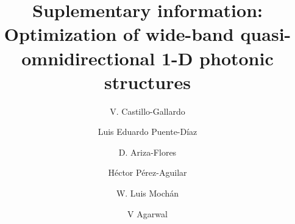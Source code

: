 \documentclass[a4paper,fleqn]{cas-sc}
\begin{document}
	\let\WriteBookmarks\relax
	\def\floatpagepagefraction{1}
	\def\textpagefraction{.001}
	
	\title [mode = title]{Suplementary information: Optimization of wide-band quasi-omnidirectional 1-D photonic structures}                      	
	\author[1,2,3]{V. Castillo-Gallardo}
	\cormark[1]
	\address[1]{Centro de Investigaci\'{o}n en Ingenier\'{i}a y
		Ciencias Aplicadas, Universidad del Estado de Morelos, Av.
		Universidad 1001, Col. Chamilpa, Cuernavaca, Morelos 62209,
		M\'{e}xico.}
	
	\author[1,2,3]{Luis Eduardo Puente-D\'{i}az}
	\address[2]{Instituto de Ciencias F\'{i}sicas, Universidad
		Nacional Aut\'{o}noma de M\'{e}xico, Av. Universidad S/N,
		Col. Chamilpa, 62210 Cuernavaca, Morelos, M\'{e}xico.}
	\address[3]{Facultad de Ciencias F\'{i}sico Matem\'{a}ticas,
		Universidad Michoacana de San Nicol\'{a}s de Hidalgo, Av.
		Francisco J. Múgica S/N 58030, Morelia, Mich., M\'{e}xico.}
	
	\author[4]{D. Ariza-Flores}
	\address[4]{CONACyT-Universidad Aut\'{o}noma de San Luis
		Potos\'{i}, Karakorum 1470, Lomas 4ta Secc, San Luis Potos\'{i},
		S.L.P., 78210, M\'{e}xico.}
	
	\author[3]{H\'{e}ctor P\'{e}rez-Aguilar}
	
	\author[2]{W. Luis Moch\'{a}n}
	\cormark[2]
	
	\author[1]{V Agarwal}
	\cormark[3]
	\fnmark[1]
	
	
\end{document}
